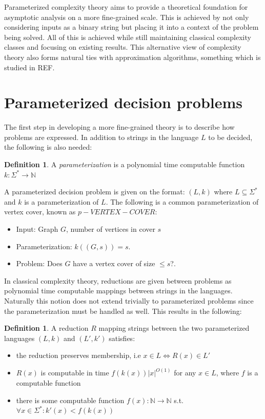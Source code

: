 \documentclass[a4paper,11pt,notitlepage]{report}
\theoremstyle{plain}
\theoremstyle{definition}
\newtheorem{defn}[thm]{Definition} %
\begin{document}
Parameterized complexity theory aims to provide a theoretical foundation for asymptotic analysis on a more fine-grained scale.
This is achieved by not only considering inputs as a binary string but placing it into a context of the problem being solved.
All of this is achieved while still maintaining classical complexity classes and focusing on existing results.
This alternative view of complexity theory also forms natural ties with approximation algorithms, something which is studied in REF.

\section{Parameterized decision problems}
The first step in developing a more fine-grained theory is to describe how problems are expressed.
In addition to strings in the language $L$ to be decided, the following is also needed:

\begin{defn}
A \emph{parameterization} is a polynomial time computable function $k : \Sigma^* \rightarrow \mathbb{N}$
\end{defn}

A parameterized decision problem is given on the format: $(L, k)$ where $L \subseteq \Sigma^*$ and $k$ is a parameterization of $L$.
The following is a common parameterization of vertex cover, known as $p-VERTEX-COVER$:
\begin{itemize}
\item Input: Graph $G$, number of vertices in cover $s$
\item Parameterization: $k((G, s)) = s$.
\item Problem: Does $G$ have a vertex cover of size $\leq s$?.
\end{itemize}

In classical complexity theory, reductions are given between problems as polynomial time computable mappings between strings in the languages.
Naturally this notion does not extend trivially to parameterized problems since the parameterization must be handled as well.
This results in the following:

\begin{defn}
A reduction $R$ mapping strings between the two parameterized languages $(L, k)$ and $(L', k')$ satisfies:
\begin{itemize}
\item the reduction preserves membership, i.e $x \in L \Leftrightarrow R(x) \in L'$
\item $R(x)$ is computable in time $f(k(x)) |x|^{O(1)}$ for any $x \in L$, where $f$ is a computable function
\item there is some computable function $f(x) : \mathbb{N} \rightarrow \mathbb{N}$ s.t. $\forall x \in \Sigma^* : k'(x) < f(k(x))$
\end{itemize}
\end{defn}
\end{document}
